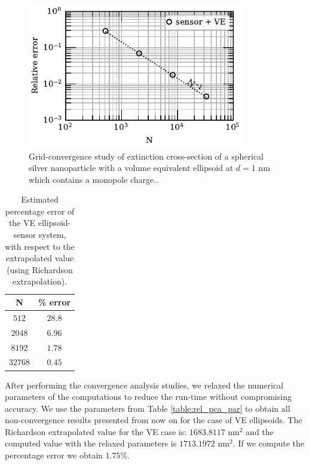 \begin{figure}%
    \centering
    \includegraphics[width=0.85\textwidth]{convergence_sensor_ve_w380.pdf} 
    \caption{Grid-convergence study of extinction cross-section of a spherical silver
             nanoparticle with a volume equivalent ellipsoid at $d=1$ nm which contains 
             a monopole charge..}
    \label{fig:err_sph-ve}
 \end{figure}

 \begin{table}%
    \centering
    \caption{\label{table:err_sph-ve} Estimated percentage error of the VE ellipsoid-sensor 
    system, with respect to the extrapolated value (using Richardson extrapolation).} 
    \begin{tabular}{c c}
    \hline%
    N & \% error \\
    \hline%
     $512$ & $28.8$ \\
     $2048$ & $6.96$ \\
     $8192$ & $1.78$ \\
     $32768$ & $0.45$ \\
    \hline%
    \end{tabular}
\end{table}

After performing the convergence analysis studies, we relaxed the numerical parameters of the computations to reduce the run-time without 
compromising accuracy. We use the parameters from Table \ref{table:rel_pca_par} to obtain all non-convergence results presented from 
now on for the case of VE ellipsoids. The Richardson extrapolated value for the VE case is: $1683.8117$ nm$^2$ and the computed value with 
the relaxed parameters is $1713.1972$ nm$^2$. If we compute the percentage error we obtain $1.75 \%$.

